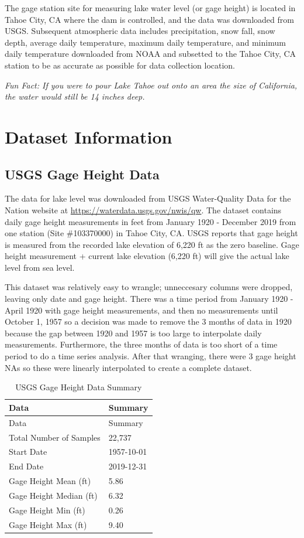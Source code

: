 \documentclass[12pt,]{article}
\begin{document}
The gage station site for measuring lake water level (or gage height) is
located in Tahoe City, CA where the dam is controlled, and the data was
downloaded from USGS. Subsequent atmospheric data includes
precipitation, snow fall, snow depth, average daily temperature, maximum
daily temperature, and minimum daily temperature downloaded from NOAA
and subsetted to the Tahoe City, CA station to be as accurate as
possible for data collection location.

\emph{Fun Fact: If you were to pour Lake Tahoe out onto an area the size
of California, the water would still be 14 inches deep.}

\newpage

\hypertarget{dataset-information}{%
\section{Dataset Information}\label{dataset-information}}

\hypertarget{usgs-gage-height-data}{%
\subsection{USGS Gage Height Data}\label{usgs-gage-height-data}}

The data for lake level was downloaded from USGS Water-Quality Data for
the Nation website at \url{https://waterdata.usgs.gov/nwis/qw}. The
dataset contains daily gage height measurements in feet from January
1920 - December 2019 from one station (Site \#103370000) in Tahoe City,
CA. USGS reports that gage height is measured from the recorded lake
elevation of 6,220 ft as the zero baseline. Gage height measurement +
current lake elevation (6,220 ft) will give the actual lake level from
sea level.

This dataset was relatively easy to wrangle; unneccesary columns were
dropped, leaving only date and gage height. There was a time period from
January 1920 - April 1920 with gage height measurements, and then no
measurements until October 1, 1957 so a decision was made to remove the
3 months of data in 1920 because the gap between 1920 and 1957 is too
large to interpolate daily measurements. Furthermore, the three months
of data is too short of a time period to do a time series analysis.
After that wranging, there were 3 gage height NAs so these were linearly
interpolated to create a complete dataset.

\begin{longtable}[]{@{}ll@{}}
\caption{\label{tab:table} USGS Gage Height Data Summary}\tabularnewline
\toprule
Data & Summary\tabularnewline
\midrule
\endfirsthead
\toprule
Data & Summary\tabularnewline
\midrule
\endhead
Total Number of Samples & 22,737\tabularnewline
Start Date & 1957-10-01\tabularnewline
End Date & 2019-12-31\tabularnewline
Gage Height Mean (ft) & 5.86\tabularnewline
Gage Height Median (ft) & 6.32\tabularnewline
Gage Height Min (ft) & 0.26\tabularnewline
Gage Height Max (ft) & 9.40\tabularnewline
\bottomrule
\end{longtable}
\end{document}
